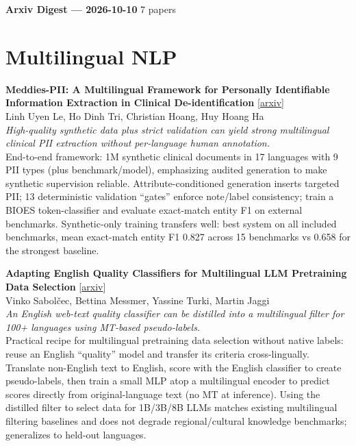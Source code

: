 \documentclass[12pt,letterpaper]{article}
\begin{document}
{\footnotesize\textbf{Arxiv Digest --- 2026-10-10} \hfill 7 papers}

\smallskip

\section*{Multilingual NLP}

{\small\textbf{Meddies-PII: A Multilingual Framework for Personally Identifiable Information Extraction in Clinical De-identification}} {\scriptsize[\href{https://arxiv.org/abs/2609.12544}{arxiv}]}\\
{\scriptsize Linh Uyen Le, Ho Dinh Tri, Christian Hoang, Huy Hoang Ha}\\

{\small\textit{High-quality synthetic data plus strict validation can yield strong multilingual clinical PII extraction without per-language human annotation.}}\\[1pt]
{\footnotesize End-to-end framework: 1M synthetic clinical documents in 17 languages with 9 PII types (plus benchmark/model), emphasizing audited generation to make synthetic supervision reliable. Attribute-conditioned generation inserts targeted PII; 13 deterministic validation ``gates'' enforce note/label consistency; train a BIOES token-classifier and evaluate exact-match entity F1 on external benchmarks. Synthetic-only training transfers well: best system on all included benchmarks, mean exact-match entity F1 0.827 across 15 benchmarks vs 0.658 for the strongest baseline.}

\medskip

{\small\textbf{Adapting English Quality Classifiers for Multilingual LLM Pretraining Data Selection}} {\scriptsize[\href{https://arxiv.org/abs/2610.11585}{arxiv}]}\\
{\scriptsize Vinko Sabol\v{c}ec, Bettina Messmer, Yassine Turki, Martin Jaggi}\\

{\small\textit{An English web-text quality classifier can be distilled into a multilingual filter for 100+ languages using MT-based pseudo-labels.}}\\[1pt]
{\footnotesize Practical recipe for multilingual pretraining data selection without native labels: reuse an English ``quality'' model and transfer its criteria cross-lingually. Translate non-English text to English, score with the English classifier to create pseudo-labels, then train a small MLP atop a multilingual encoder to predict scores directly from original-language text (no MT at inference). Using the distilled filter to select data for 1B/3B/8B LLMs matches existing multilingual filtering baselines and does not degrade regional/cultural knowledge benchmarks; generalizes to held-out languages.}
\end{document}
